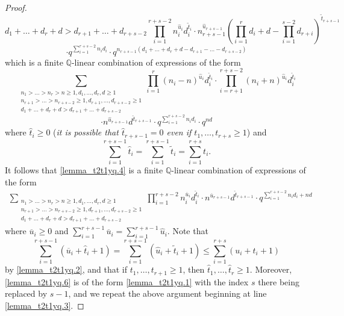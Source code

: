 \documentclass[12pt, reqno]{amsart}
\theoremstyle{definition}
\theoremstyle{remark}
\numberwithin{equation}{section}
\newcommand{\Q}{ \mathbb Q }
\newcommand{\w}{\tilde}
\numberwithin{equation}{section}
\begin{document}
\begin{proof}
$${{    d_1+ \ldots + d_r + d > d_{r+1} + \ldots + d_{r+s-2}}}
    \prod_{i=1}^{r+s-2} n_i^{\hat u_i}d_i^{\w t_i} \cdot 
    n_{r+s-1}^{\hat u_{r+s-1}} \left (\prod_{i=1}^{r} 
    d_i + d - \prod_{i=1}^{s-2} d_{r+i} \right )^{\w t_{r+s-1}}
$$
$$
\cdot q^{\sum_{i=1}^{r+s-2} n_i d_i}
\cdot q^{n_{r+s-1} (d_1+ \ldots + d_r + d - d_{r+1} - \ldots - d_{r+s-2})}
$$
which is a finite $\Q$-linear combination of expressions of the form
$$
\sum_{\substack{n_1 > \ldots > n_r > n \ge 1, d_1, \ldots, d_r, d \ge 1\\
    n_{r+1} > \ldots > n_{r+s-2} \ge 1, d_{r+1}, \ldots, d_{r+s-2} \ge 1\\
    d_1+ \ldots + d_r + d > d_{r+1} + \ldots + d_{r+s-2}}}
    \prod_{i=1}^{r} (n_i-n)^{\hat u_i}d_i^{\hat t_i} \cdot 
    \prod_{i=r+1}^{r+s-2} (n_i+n)^{\hat u_i}d_i^{\hat t_i} 
$$
$$
\cdot n^{\hat u_{r+s-1}} d^{\hat t_{r+s-1}}
\cdot q^{\sum_{i=1}^{r+s-2} n_i d_i} \cdot q^{nd}
$$
where $\hat t_i \ge 0$ ({\it it is possible that $\hat t_{r+s-1}=0$ 
even if $t_1, \ldots, t_{r+s} \ge 1$}) and 
$$
  \sum_{i=1}^{r+s-1} \hat t_i = \sum_{i=1}^{r+s-1} \w t_i 
= \sum_{i=1}^{r+s} t_i. 
$$
It follows that \eqref{lemma_t2t1yq.4} 
is a finite $\Q$-linear combination of expressions of the form
\begin{eqnarray}  \label{lemma_t2t1yq.6}
\sum_{\substack{n_1 > \ldots > n_r > n \ge 1, d_1, \ldots, d_r, d \ge 1\\
    n_{r+1} > \ldots > n_{r+s-2} \ge 1, d_{r+1}, \ldots, d_{r+s-2} \ge 1\\
    d_1+ \ldots + d_r + d > d_{r+1} + \ldots + d_{r+s-2}}}
    \prod_{i=1}^{r+s-2} n_i^{\overline u_i}d_i^{\hat t_i} \cdot 
    n^{\overline u_{r+s-1}} d^{\hat t_{r+s-1}}
    \cdot q^{\sum_{i=1}^{r+s-2} n_i d_i + nd}
\end{eqnarray} 
where $\overline u_i \ge 0$ and $\sum_{i=1}^{r+s-1} \overline u_i 
= \sum_{i=1}^{r+s-1} \hat u_i$. Note that 
$$
    \sum_{i=1}^{r+s-1} (\overline u_i + \hat t_i + 1)  
= \sum_{i=1}^{r+s-1} (\hat u_i + \w t_i + 1)    
\le \sum_{i=1}^{r+s} (u_i + t_i + 1)
$$
by \eqref{lemma_t2t1yq.2}, and that if $t_1, \ldots, t_{r+1} \ge 1$, 
then $\hat t_1, \ldots, \hat t_{r} \ge 1$. Moreover, 
\eqref{lemma_t2t1yq.6} is of the form \eqref{lemma_t2t1yq.1} 
with the index $s$ there being replaced by $s-1$,
and we repeat the above argument beginning at line \eqref{lemma_t2t1yq.3}.


\end{proof}
\end{document}
